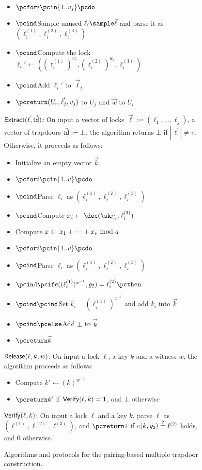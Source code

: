 \begin{figure*}[htb]
\begin{center}
{\begin{minipage}[t]{0.75\textwidth}
\begin{itemize}[label=-]
				\item $\pcfor i \pcin \{1..v_j\} \pcdo$
				\item $\pcind$Sample unused $\ell_i \sample \vec{\ell}$ and parse it as 
				$(\ell_i^{(1)},\ell_i^{(2)},\ell_i^{(3)})$
				\item $\pcind$Compute the lock $\ell_i' \gets((\ell_i^{(1)})^{w_i},
				(\ell_i^{(2)})^{w_i},\ell_i^{(3)})$
				\item $\pcind$Add $\ell_i'$ to $\vec{\ell}_j$
				\item $\pcreturn (U_r,\vec{\ell}_j,v_j)$ to $U_j$ and $\vec{w}$ to $U_i$
			\end{itemize}
			\underline{$\mathsf{Extract}(\vec{\ell}, \vec{\mathsf{td}})$}: On input a vector of locks 
			$\vec{\ell} := (\ell_1,\ldots,\ell_j)$, a vector of trapdoors $\vec{\mathsf{td}} := \bot$, 
			the algorithm returns $\bot$ if $|\vec{\ell}| \neq v$. Otherwise, it proceeds as 
			follows:
			\begin{itemize}[label=-]
				\item Initialize an empty vector $\vec{k}$
				\item $\pcfor i \pcin \{1..v\} \pcdo$
				\item $\pcind$Parse $\ell_i$ as $(\ell_i^{(1)},\ell_i^{(2)},\ell_i^{(3)})$
				\item $\pcind$Compute $x_i \gets \dec(\sk_{U_r},\ell_i^{(3)})$
				\item Compute $x \gets x_1 + \cdots + x_v \ \mathrm{mod}\ q$
				\item $\pcfor i \pcin \{1..v\} \pcdo$
				\item $\pcind$Parse $\ell_i$ as $(\ell_i^{(1)},\ell_i^{(2)},\ell_i^{(3)})$
				\item $\pcind \pcif e((\ell_i^{(1)})^{x^{-1}}, g_2) = \ell_i^{(2)} \pcthen$
				\item $\pcind \pcind$Set $k_i = (\ell_i^{(1)})^{x^{-1}}$ and add $k_i$ into 
				$\vec{k}$
				\item $\pcind \pcelse$Add $\bot$ to $\vec{k}$
				\item $\pcreturn \vec{k}$
			\end{itemize}
			\underline{$\mathsf{Release}(\ell, k, w)$}: On input a lock $\ell$, a key $k$ and 
			a witness $w$, the algorithm proceeds as follows:
			\begin{itemize}[label=-]
				\item Compute $k' \gets (k)^{w^{-1}}$
				\item $\pcreturn k'$ if $\mathsf{Verify}(\ell, k) = 1$, and $\bot$ otherwise
			\end{itemize}
			\underline{$\mathsf{Verify}(\ell, k)$}: On input a lock $\ell$ and a key $k$, 
			parse $\ell$ as $(\ell^{(1)},\ell^{(2)}, \ell^{(3)})$, and $\pcreturn 1$ if $e(k, g_2) \stackrel{?}{=} 
			\ell^{(2)}$ holds, and 0 otherwise.
		\end{minipage}
	}
	\end{center}
	
	\caption{Algorithms and protocols for the pairing-based multiple trapdoor construction.}
	\label{fig:single-trapdoor}
\end{figure*}


